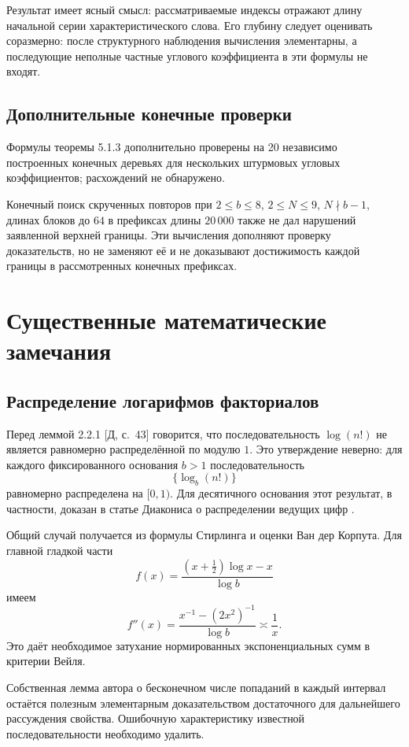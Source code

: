 \documentclass[12pt,a4paper]{article}
\newcommand{\sref}[1]{\textnormal{[Д, с.~#1]}}
\begin{document}
Результат имеет ясный смысл: рассматриваемые индексы отражают длину
начальной серии характеристического слова. Его глубину следует оценивать
соразмерно: после структурного наблюдения вычисления элементарны,
а последующие неполные частные углового коэффициента в эти формулы
не входят.

\subsection{Дополнительные конечные проверки}

Формулы теоремы 5.1.3 дополнительно проверены на 20 независимо
построенных конечных деревьях для нескольких штурмовых угловых
коэффициентов; расхождений не обнаружено.

Конечный поиск скрученных повторов при $2\le b\le8$, $2\le N\le9$,
$N\nmid b-1$, длинах блоков до $64$ в префиксах длины $20\,000$
также не дал нарушений заявленной верхней границы. Эти вычисления
дополняют проверку доказательств, но не заменяют её и не доказывают
достижимость каждой границы в рассмотренных конечных префиксах.

\section{Существенные математические замечания}

\subsection{Распределение логарифмов факториалов}

Перед леммой 2.2.1 \sref{43} говорится, что последовательность
$\log(n!)$ не является равномерно распределённой по модулю $1$.
Это утверждение неверно: для каждого фиксированного основания $b>1$
последовательность
\[
  \{\log_b(n!)\}
\]
равномерно распределена на $[0,1)$. Для десятичного основания этот
результат, в частности, доказан в статье Диакониса о распределении
ведущих цифр \cite{diaconis}.

Общий случай получается из формулы Стирлинга и оценки Ван дер Корпута.
Для главной гладкой части
\[
  f(x)=\frac{(x+\tfrac12)\log x-x}{\log b}
\]
имеем
\[
  f''(x)=\frac{x^{-1}-(2x^2)^{-1}}{\log b}\asymp\frac1x.
\]
Это даёт необходимое затухание нормированных экспоненциальных сумм
в критерии Вейля.

Собственная лемма автора о бесконечном числе попаданий в каждый
интервал остаётся полезным элементарным доказательством достаточного
для дальнейшего рассуждения свойства. Ошибочную характеристику
известной последовательности необходимо удалить.
\end{document}
